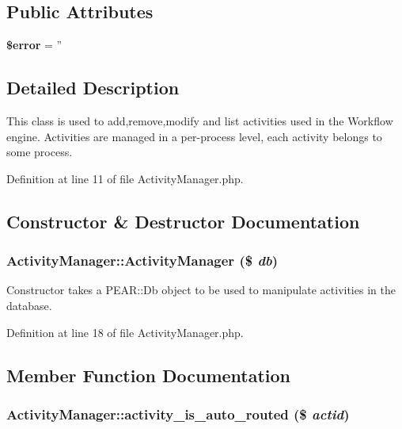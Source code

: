 \subsection*{Public Attributes}
\begin{CompactItemize}
\item 
{\bf \$error} = ''\label{classActivityManager_o0}

\end{CompactItemize}


\subsection{Detailed Description}
This class is used to add,remove,modify and list activities used in the Workflow engine. Activities are managed in a per-process level, each activity belongs to some process. 



Definition at line 11 of file Activity\-Manager.php.

\subsection{Constructor \& Destructor Documentation}
\subsubsection{\setlength{\rightskip}{0pt plus 5cm}Activity\-Manager::Activity\-Manager (\$ {\em db})}\label{classActivityManager_a0}


Constructor takes a PEAR::Db object to be used to manipulate activities in the database. 

Definition at line 18 of file Activity\-Manager.php.

\subsection{Member Function Documentation}
\subsubsection{\setlength{\rightskip}{0pt plus 5cm}Activity\-Manager::activity\_\-is\_\-auto\_\-routed (\$ {\em actid})}\label{classActivityManager_a10}



